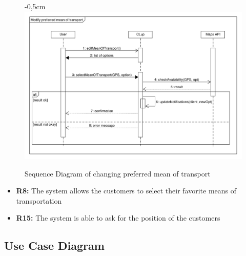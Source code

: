 \documentclass{article}
\begin{document}
\begin{center}
\begin{adjustwidth}{-1.5cm}{}
\begin{tabular}[h!]{|m{7.5em}|m{27.5em}|}
						\end{tabular}
					\end{adjustwidth}
					
					\begin{figure}[!htb]
						\begin{adjustwidth} {-0,5cm}{}
							\centering
							\includegraphics[scale=0.42]{SD/12_selectPreferredMeanOfTransport.pdf}\\
							\caption{Sequence Diagram of changing preferred mean of transport}
						\end{adjustwidth}

					\end{figure}
					
					
					\begin{itemize}
						\medskip
						\newpage
						{\bfseries Required functional requirements: }
						
						
						\item {\bfseries R8: } The system allows the customers to select their favorite means of transportation
						\item {\bfseries R15: } The system is able to ask for the position of the customers
											
						
					\end{itemize}
				\end{center}
		
		\subsection{Use Case Diagram}
		
\end{document}
